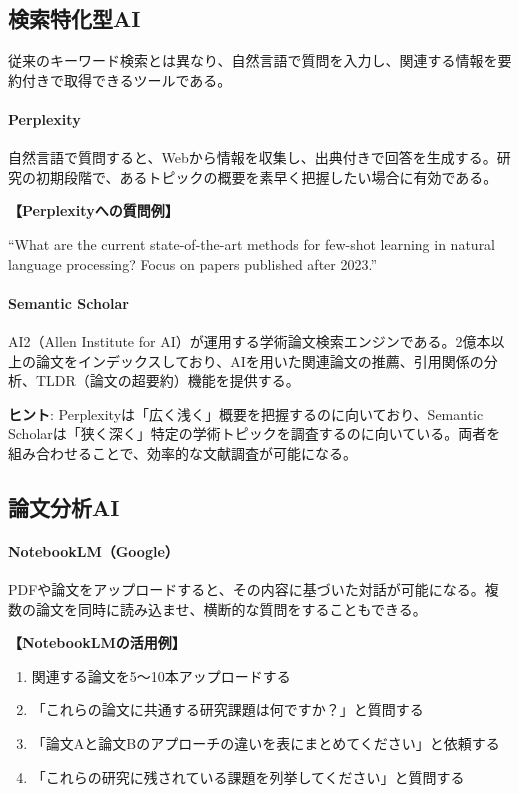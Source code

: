 \subsection{検索特化型AI}

従来のキーワード検索とは異なり、自然言語で質問を入力し、関連する情報を要約付きで取得できるツールである。

\paragraph{Perplexity}
自然言語で質問すると、Webから情報を収集し、出典付きで回答を生成する。研究の初期段階で、あるトピックの概要を素早く把握したい場合に有効である。

\begin{promptbox}
\textbf{【Perplexityへの質問例】}

``What are the current state-of-the-art methods for few-shot learning in natural language processing? Focus on papers published after 2023.''
\end{promptbox}

\paragraph{Semantic Scholar}
AI2（Allen Institute for AI）が運用する学術論文検索エンジンである。2億本以上の論文をインデックスしており、AIを用いた関連論文の推薦、引用関係の分析、TLDR（論文の超要約）機能を提供する。

\begin{screen}
\textbf{ヒント}: Perplexityは「広く浅く」概要を把握するのに向いており、Semantic Scholarは「狭く深く」特定の学術トピックを調査するのに向いている。両者を組み合わせることで、効率的な文献調査が可能になる。
\end{screen}

\subsection{論文分析AI}

\paragraph{NotebookLM（Google）}
PDFや論文をアップロードすると、その内容に基づいた対話が可能になる。複数の論文を同時に読み込ませ、横断的な質問をすることもできる。

\begin{promptbox}
\textbf{【NotebookLMの活用例】}
\begin{enumerate}
\item 関連する論文を5〜10本アップロードする
\item 「これらの論文に共通する研究課題は何ですか？」と質問する
\item 「論文Aと論文Bのアプローチの違いを表にまとめてください」と依頼する
\item 「これらの研究に残されている課題を列挙してください」と質問する
\end{enumerate}
\end{promptbox}

